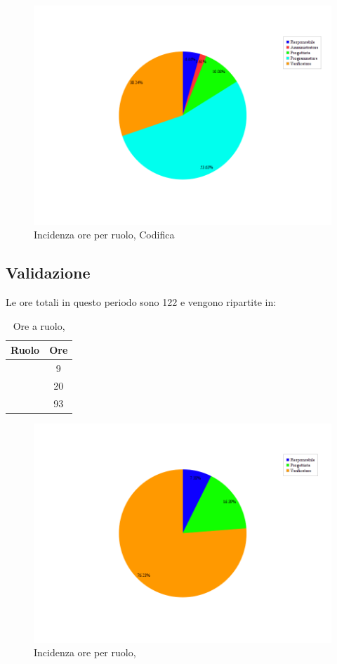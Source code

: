 \begin{figure}[ht]
	\centering
	\includegraphics[scale=0.65]{immagini/Grafi/OreRuoloCod}
	\caption{Incidenza ore per ruolo, Codifica}
\end{figure} \FloatBarrier

\newpage
\subsection{Validazione}
Le ore totali in questo periodo sono 122 e vengono ripartite in:
\begin{table}[H]
	\begin{center}
		\begin{tabular}{|c|c|}
			\hline
			\textbf{Ruolo}	& \textbf{Ore} \\
			\hline
			\Res	&	9	\\
			\hline
			\Prog		&	20	\\
			\hline
			\Ver	&	93	\\
			\hline
		\end{tabular}
	\end{center}
	\caption{Ore a ruolo, \VV}
\end{table}

\begin{figure}[ht]
	\centering
	\includegraphics[scale=0.65]{immagini/Grafi/OreRuoloVerifica}
	\caption{Incidenza ore per ruolo, \VV}
\end{figure} \FloatBarrier


